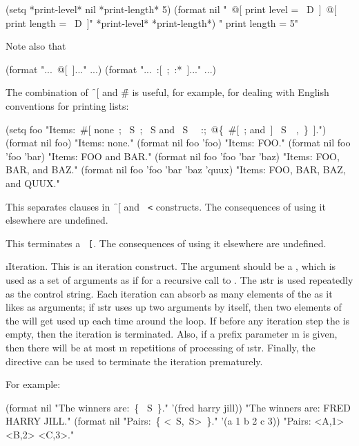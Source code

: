 \code
 (setq *print-level* nil *print-length* 5)
 (format nil
        "~@[ print level = ~D~]~@[ print length = ~D~]"
        *print-level* *print-length*)
\EV  " print length = 5"
\endcode

Note also that

\code
 (format  "...~@[~]..." ...)
\EQ (format  "...~:[~;~:*~]..." ...)
\endcode

The combination of \f{~[} and \f{\#} is useful, for
example, for dealing with English conventions for printing lists:
                         
\code
 (setq foo "Items:~#[ none~; ~S~; ~S and ~S~
           ~:;~@\{~#[~; and~] ~S~\hat\ ,~\}~].")
 (format nil foo) \EV  "Items: none."
 (format nil foo 'foo) \EV  "Items: FOO."
 (format nil foo 'foo 'bar) \EV  "Items: FOO and BAR."
 (format nil foo 'foo 'bar 'baz) \EV  "Items: FOO, BAR, and BAZ."
 (format nil foo 'foo 'bar 'baz 'quux) \EV  "Items: FOO, BAR, BAZ, and QUUX."
\endcode

\itemitem{\tt ~;}                                           

This separates clauses in \f{~[} and {\tt ~<}
constructs.  The consequences of using it elsewhere are undefined.

\itemitem{\tt ~]}

This terminates a {\tt ~[}.
The consequences of using it elsewhere are undefined.


\i{Iteration}.
This is an iteration construct.  The argument should be a ,
which is used as a set of arguments 
as if for a recursive call to .
The  \i{str} is used repeatedly as the control string.
Each iteration can absorb as many elements of the  as it likes
as arguments;
if \i{str} uses up two arguments by itself, then two elements of the
 will get used up each time around the loop.
If before any iteration step the  
is empty, then the iteration is terminated.
Also, if a prefix parameter \i{n} is given, then there will be at most \i{n}
repetitions of processing of \i{str}.  
Finally, the {\tt ~\hat } directive can be
used to terminate the iteration prematurely.

For example:
                                                                       
\code
 (format nil "The winners are:~\{ ~S~\}." 
         '(fred harry jill)) 
\EV "The winners are: FRED HARRY JILL."                           
 (format nil "Pairs:~\{ <~S,~S>~\}." 
         '(a 1 b 2 c 3))
\EV "Pairs: <A,1> <B,2> <C,3>."
\endcode

